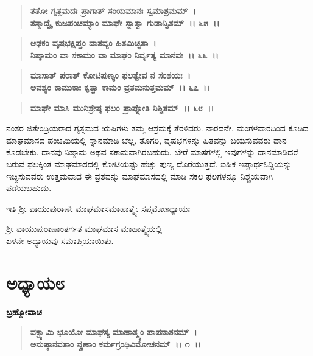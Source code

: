 \begin{verse}
\textbf{ತತೋ ಗೃತ್ಸಮದಃ ಪ್ರಾಗಾತ್ ಸಂಯಮಾನಃ ಸ್ವಮಾಶ್ರಮಮ್~।}\\\textbf{ತಸ್ಮಾದ್ವೈ ಕುಜಪಂಚಮ್ಯಾಂ ಮಾಘೇ ಸ್ನಾತ್ವಾ ಗುಡಾನ್ವಿತಮ್~।। ೬೫~।। }
\end{verse}

\begin{verse}
\textbf{ಆಢಕಂ ವೃಷಭಕ್ಷಿಪ್ತಂ ದಾತವ್ಯಂ ಹಿತಮಿಚ್ಛತಾ~।}\\\textbf{ನಿಷ್ಕಾಮಂ ವಾ ಸಕಾಮಂ ವಾ ಮಾಘಂ ನಿರ್ವೃತ್ಯ ಮಾನವಃ~।। ೬೬~।।} 
\end{verse}

\begin{verse}
\textbf{ಮಾಸಾತ್ ಪರಾತ್ ಕೋಟಿಪುಣ್ಯಂ ಫಲತ್ವೇವ ನ ಸಂಶಯಃ~।}\\\textbf{ಅವಶ್ಯಂ ಕಾಮುಕಾಃ ಕೃತ್ವಾ ಕಾಮಂ ವ್ರತಮನುತ್ತಮಮ್~।। ೬೭~।।} 
\end{verse}

\begin{verse}
\textbf{ಮಾಘೇ ಮಾಸಿ ಮುನಿಶ್ರೇಷ್ಠ ಫಲಂ ಪ್ರಾಪ್ನೋತಿ ನಿಶ್ಚಿತಮ್~।। ೬೮~।।}
\end{verse}

ನಂತರ ಜಿತೇಂದ್ರಿಯರಾದ ಗೃತ್ಸಮದ ಋಷಿಗಳು ತಮ್ಮ ಆಶ್ರಮಕ್ಕೆ ತೆರಳಿದರು. ನಾರದನೇ, ಮಂಗಳವಾರದಿಂದ ಕೂಡಿದ ಮಾಘಮಾಸದ ಪಂಚಮಿಯಲ್ಲಿ ಸ್ನಾನಮಾಡಿ ಬೆಲ್ಲ, ತೊಗರಿ, ವೃಷಭಗಳನ್ನು ಹಿತವನ್ನು ಬಯಸುವವರು ದಾನ ಕೊಡಬೇಕು. ದಾನವು ನಿಷ್ಕಾಮ ಅಥವ ಸಕಾಮವಾಗಿರಬಹುದು. ಬೇರೆ ಮಾಸಗಳಲ್ಲಿ ಇವುಗಳನ್ನು ದಾನಮಾಡಿದರೆ ಬರುವ ಫಲಕ್ಕಿಂತ ಮಾಘಮಾಸದಲ್ಲಿ ಕೋಟಿಯಷ್ಟು ಹೆಚ್ಚು ಪುಣ್ಯ ದೊರೆಯುತ್ತದೆ. ಐಹಿಕ ಇಷ್ಟಾರ್ಥಸಿದ್ದಿಯನ್ನು ಇಚ್ಚಿಸುವವರು ಉತ್ತಮವಾದ ಈ ವ್ರತವನ್ನು ಮಾಘಮಾಸದಲ್ಲಿ ಮಾಡಿ ಸಕಲ ಫಲಗಳನ್ನೂ ನಿಶ್ಚಯವಾಗಿ ಪಡೆಯಬಹುದು.

\begin{center}
ಇತಿ ಶ‍್ರೀ ವಾಯುಪುರಾಣೇ ಮಾಘಮಾಸಮಾಹಾತ್ಮ್ಯೇ ಸಪ್ತಮೋsಧ್ಯಾಯಃ 
\end{center}

\begin{center}
ಶ‍್ರೀ ವಾಯುಪುರಾಣಾಂತರ್ಗತ ಮಾಘಮಾಸ ಮಾಹಾತ್ಮ್ಯೆಯಲ್ಲಿ \\ ಏಳನೇ ಅಧ್ಯಾಯವು ಸಮಾಪ್ತಿಯಾಯಿತು.
\end{center}

\newpage

\section*{ಅಧ್ಯಾಯ\enginline{-}೮}

\emptypage

\begin{flushleft}
\textbf{ಬ್ರಹ್ಮೋವಾಚ\enginline{-} }
\end{flushleft}

\begin{verse}
\textbf{ವಕ್ಷ್ಯಾಮಿ ಭೂಯೋ ಮಾಘಸ್ಯ ಮಾಹಾತ್ಮ್ಯಂ ಪಾಪನಾಶನಮ್~।}\\\textbf{ಅನುಷ್ಠಾನವತಾಂ ನೄಣಾಂ ಕರ್ಮಗ್ರಂಥಿವಿಮೋಚನಮ್~।। ೧~।। }
\end{verse}

